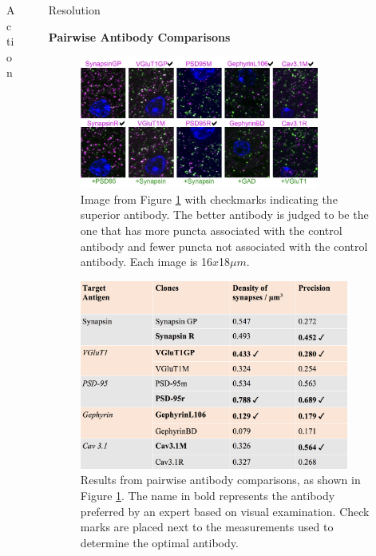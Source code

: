 \documentclass[final, table]{beamer}
\newlength{\sepwid}
\newlength{\onecolwid}
\newlength{\twocolwid}
\begin{document}
\begin{frame}[t]
\begin{columns}[t]
\begin{column}{\twocolwid}
\begin{block}{Action}
\begin{columns}[t]
\begin{column}{\onecolwid}
\end{column}
\end{columns} 
\end{block}
\end{column} 

\begin{column}{\sepwid}\end{column}  %
\begin{column}{\onecolwid}

\begin{block}{Resolution} 

\textbf{Pairwise Antibody Comparisons} 


\begin{figure}
\centering
\includegraphics[width=0.8\textwidth]{figs/pairwise_check}
\caption{Image from Figure \ref{fig:pairwise_check} with checkmarks indicating the superior antibody. The better antibody is judged to be the one that has more puncta associated with the control antibody and fewer puncta not associated with the control antibody. Each image is 16$x$18$\mu m$. }
\label{fig:pairwise_check}
\end{figure}


\begin{figure}
\centering
\includegraphics[width=0.9\textwidth]{figs/pairwise_table}
\caption{Results from pairwise antibody comparisons, as shown in Figure \ref{fig:pairwise_check}.  The name in bold represents the antibody preferred by an expert based on visual examination.  Check marks are placed next to the measurements used to determine the optimal antibody.}
\label{fig:pairwise_table}
\end{figure}


\end{block}
\end{column}
\end{columns}
\end{frame}
\end{document}
